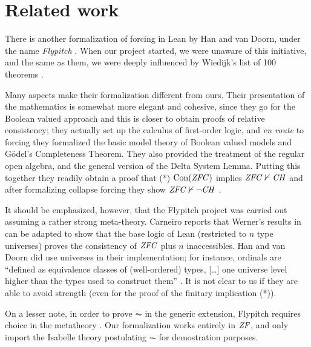 \section{Related work}
\label{sec:related-work}

There is another formalization of forcing in Lean by Han and van
Doorn, under the name \emph{Flypitch} \cite{han_et_al:LIPIcs:2019:11074,DBLP:conf/cpp/HanD20}. When our project started, we
were unaware of this initiative, and the same as them, we were deeply
influenced by Wiedijk's list of 100 theorems \cite{Formalizing100}.

Many aspects make their formalization different from ours. Their
presentation of the mathematics is somewhat more elegant and cohesive,
since they go for the Boolean valued approach and this is closer to
obtain proofs of relative consistency; they actually set up the
calculus of first-order logic, and \emph{en route} to forcing they
formalized the basic model theory of Boolean valued models and Gödel's
Completeness Theorem. They also provided the treatment of the regular
open algebra, and the general version of the Delta System
Lemma. Putting this together they readily obtain a proof that
(*) $\operatorname{Con}(\mathit{ZFC})$ implies 
$\mathit{ZFC}\nvdash \mathit{CH}$ \cite{han_et_al:LIPIcs:2019:11074} and after
formalizing collapse forcing they show  $\mathit{ZFC}\nvdash \neg\mathit{CH}$
\cite{DBLP:conf/cpp/HanD20}.

It should be emphasized, however, that the Flypitch project was
carried out assuming a rather strong meta-theory. 
Carneiro \cite{carneiro-ms-thesis} reports that Werner's results in
\cite{10.5555/645869.668660} can be adapted to show that the base
logic  of Lean (restricted to $n$
type universes) proves the consistency of $\mathit{ZFC}$ plus $n$
inaccessibles. Han and van Doorn did use universes in their
implementation; for instance, ordinals are “defined as equivalence
classes of (well-ordered) types, [\dots] one
universe level higher than the types used to construct them”
\cite{han_et_al:LIPIcs:2019:11074}. It is not clear to us if they are
able to avoid strength (even for the proof of the finitary implication
(*)).

On a lesser note, in order to prove $\AC$ in the generic extension,
Flypitch requires choice in the metatheory
\cite[p.~11]{han_et_al:LIPIcs:2019:11074}. Our formalization works
entirely in $\mathit{ZF}$, and only import the Isabelle theory postulating
$\AC$ for demostration purposes.

